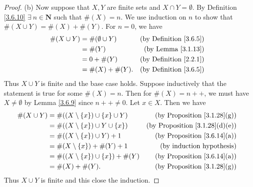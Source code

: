 \begin{proof}{(b)}
Now suppose that \(X, Y\) are finite sets and \(X \cap Y = \emptyset\).
By Definition \ref{3.6.10} \(\exists\ n \in \mathbf{N}\) such that \(\#(X) = n\).
We use induction on \(n\) to show that \(\#(X \cup Y) = \#(X) + \#(Y)\).
For \(n = 0\), we have
\begin{align*}
\#(X \cup Y) &= \#(\emptyset \cup Y) & \text{(by Definition \ref{3.6.5})} \\
&= \#(Y) & \text{(by Lemma \ref{3.1.13})} \\
&= 0 + \#(Y) & \text{(by Definition \ref{2.2.1})} \\
&= \#(X) + \#(Y). & \text{(by Definition \ref{3.6.5})}
\end{align*}
Thus \(X \cup Y\) is finite and the base case holds.
Suppose inductively that the statement is true for some \(\#(X) = n\).
Then for \(\#(X) = n++\), we must have \(X \neq \emptyset\) by Lemma \ref{3.6.9} since \(n++ \neq 0\).
Let \(x \in X\).
Then we have
\begin{align*}
\#(X \cup Y) &= \#((X \setminus \{x\}) \cup \{x\} \cup Y) & \text{(by Proposition \ref{3.1.28}(g))} \\
&= \#((X \setminus \{x\}) \cup Y \cup \{x\}) & \text{(by Proposition \ref{3.1.28}(d)(e))} \\
&= \#((X \setminus \{x\}) \cup Y) + 1 & \text{(by Proposition \ref{3.6.14}(a))} \\
&= \#(X \setminus \{x\}) + \#(Y) + 1 & \text{(by induction hypothesis)} \\
&= \#((X \setminus \{x\}) \cup \{x\}) + \#(Y) & \text{(by Proposition \ref{3.6.14}(a))} \\
&= \#(X) + \#(Y). & \text{(by Proposition \ref{3.1.28}(g))}
\end{align*}
Thus \(X \cup Y\) is finite and this close the induction.
\end{proof}

